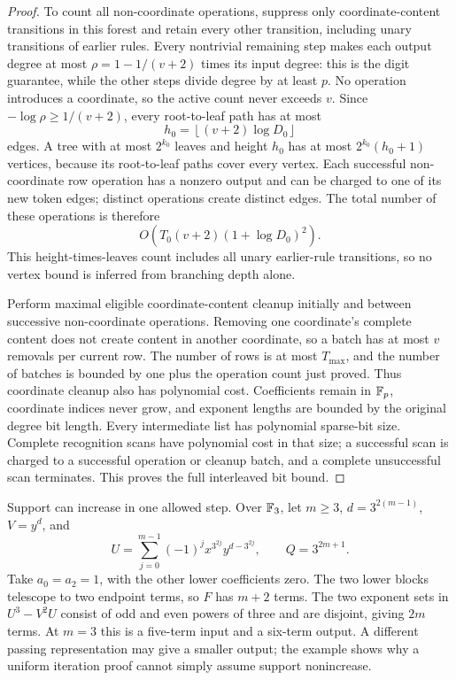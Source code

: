 \begin{proof}
To count all non-coordinate operations, suppress only
coordinate-content transitions in this forest and retain every
other transition, including unary transitions of earlier rules.
Every nontrivial remaining step makes each output degree at most
$\rho=1-1/(v+2)$ times its input degree: this is the digit guarantee,
while the other steps divide degree by at least $p$. No operation
introduces a coordinate, so the active count never exceeds $v$.
Since $-\log\rho\ge1/(v+2)$, every root-to-leaf path has at most
\[
 h_0=\left\lfloor(v+2)\log D_0\right\rfloor
\]
edges. A tree with at most $2^{k_0}$ leaves and height $h_0$ has at
most $2^{k_0}(h_0+1)$ vertices, because its root-to-leaf paths cover
every vertex. Each successful non-coordinate row operation has a
nonzero output and can be charged to one of its new token edges;
distinct operations create distinct edges. The total number of
these operations is therefore
\[
 O\!\left(T_0(v+2)(1+\log D_0)^2\right).
\]
This height-times-leaves count includes all unary earlier-rule
transitions, so no vertex bound is inferred from branching depth
alone.

Perform maximal eligible coordinate-content cleanup initially and
between successive non-coordinate operations. Removing one
coordinate's complete content does not create content in another
coordinate, so a batch has at most $v$ removals per current row.
The number of rows is at most $T_{\max}$, and the number of batches
is bounded by one plus the operation count just proved. Thus
coordinate cleanup also has polynomial cost. Coefficients remain
in $\mathbb F_p$, coordinate indices never grow, and exponent lengths are
bounded by the original degree bit length. Every intermediate list
has polynomial sparse-bit size. Complete recognition scans have
polynomial cost in that size; a successful scan is charged to a
successful operation or cleanup batch, and a complete unsuccessful
scan terminates. This proves the full interleaved bit bound.
\end{proof}

Support can increase in one allowed step. Over $\mathbb F_3$, let $m\ge3$,
$d=3^{2(m-1)}$, $V=y^d$, and
\[
 U=\sum_{j=0}^{m-1}(-1)^j
       x^{3^{2j}}y^{d-3^{2j}},\qquad Q=3^{2m+1}.
\]
Take $a_0=a_2=1$, with the other lower coefficients zero. The two
lower blocks telescope to two endpoint terms, so $F$ has $m+2$
terms. The two exponent sets in $U^3-V^2U$ consist of odd and even
powers of three and are disjoint, giving $2m$ terms. At $m=3$ this
is a five-term input and a six-term output. A different passing
representation may give a smaller output; the example shows why a
uniform iteration proof cannot simply assume support nonincrease.

